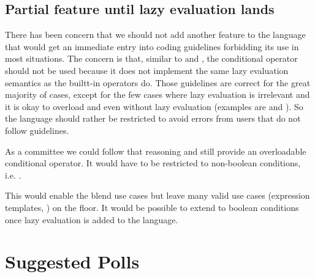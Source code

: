 
\subsection{Partial feature until lazy evaluation lands}
There has been concern that we should not add another feature to the language that would get an immediate entry into coding guidelines forbidding its use in most situations.
The concern is that, similar to  and , the conditional operator should not be used because it does not implement the same lazy evaluation semantics as the builtt-in operators do.
Those guidelines are correct for the great majority of cases, except for the few cases where lazy evaluation is irrelevant and it is okay to overload \code{\&\&} and \code{||} even without lazy evaluation (examples are  and ).
So the language should rather be restricted to avoid errors from users that do not follow guidelines.

As a committee we could follow that reasoning and still provide an overloadable conditional operator.
It would have to be restricted to non-boolean conditions, i.e. .

This would enable the blend use cases but leave many valid use cases (expression templates, ) on the floor.
It would be possible to extend  to boolean conditions once lazy evaluation is added to the language.

\section{Suggested Polls}


